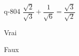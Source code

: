 \begin{truefalse}{q-804}
$\dfrac{\sqrt{2}}{\sqrt{3}} + \dfrac{1}{\sqrt{6}} = \dfrac{\sqrt{3}}{\sqrt{2}}$
\item* Vrai
\item Faux
\end{truefalse}

